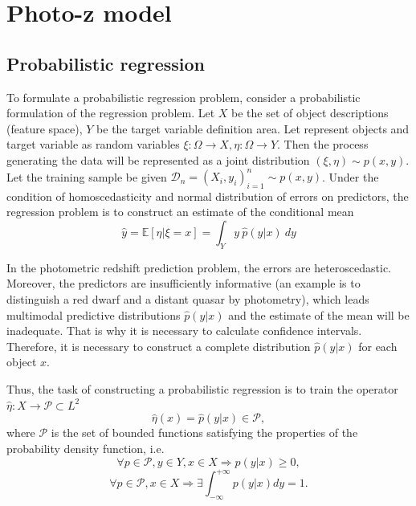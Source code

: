\documentclass[fleqn,usenatbib]{mnras}
\begin{document}

\section{Photo-z model}\label{sec:thealgorithm}

\subsection{Probabilistic regression}
To formulate a probabilistic regression problem, consider a probabilistic formulation of the regression problem. Let \(X\) be the set of object descriptions (feature space), \(Y\) be the target variable definition area. Let represent objects and target variable as random variables \(\xi : \Omega \rightarrow X, \eta : \Omega \rightarrow Y \). Then the process generating the data will be represented as a joint distribution \((\xi, \eta) \sim p(x, y)\). Let the training sample be given \(\mathcal{D}_n = (X_i, y_i)_{i=1}^n \sim p(x,y)\). Under the condition of homoscedasticity and normal distribution of errors on predictors, the regression problem is to construct an estimate of the conditional mean
\begin{equation}\label{eq:regr_classic}
     \hat{y} = \mathbb{E}[\eta | \xi = x] = \int_Y y ~ \hat{p}(y|x) ~ dy
\end{equation}

In the photometric redshift prediction problem, the errors are heteroscedastic. Moreover, the predictors are insufficiently informative (an example is to distinguish a red dwarf and a distant quasar by photometry), which leads multimodal predictive distributions $\hat{p}(y|x)$ and the estimate of the mean will be inadequate. That is why it is necessary to calculate confidence intervals. Therefore, it is necessary to construct a complete distribution $\hat{p}(y|x)$ for each object $x$.

Thus, the task of constructing a probabilistic regression is to train the operator \(\hat{\eta} : X \rightarrow \mathcal{P} \subset L^2\)
\begin{equation}
    \hat{\eta}(x) = \hat{p}(y|x) \in \mathcal{P},
\end{equation}
where \(\mathcal{P}\) is the set of bounded functions satisfying the properties of the probability density function, i.e.
\begin{equation}
    \forall p \in \mathcal{P}, y \in Y, x \in X \Rightarrow p(y|x) \geq 0,
\end{equation}
\begin{equation}
    \forall p \in \mathcal{P}, x \in X \Rightarrow \exists \int_{-\infty}^{+\infty} p(y|x) dy = 1.
\end{equation}
\end{document}
